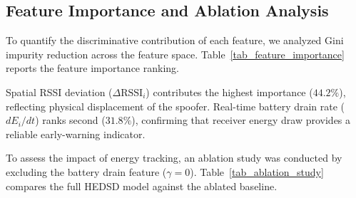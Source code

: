 \documentclass[conference]{IEEEtran}
\begin{document}
\begin{enumerate}
\subsection{Feature Importance and Ablation Analysis}
To quantify the discriminative contribution of each feature, we analyzed Gini impurity reduction across the feature space. Table~\ref{tab_feature_importance} reports the feature importance ranking.

\begin{table}[htbp]
\caption{Feature Importance Ranking in Multi-Feature Anomaly Engine}
\label{tab_feature_importance}
\centering
\small
\renewcommand{\arraystretch}{1.15}
\end{table}

Spatial RSSI deviation ($\Delta\text{RSSI}_i$) contributes the highest importance ($44.2\%$), reflecting physical displacement of the spoofer. Real-time battery drain rate ($dE_i/dt$) ranks second ($31.8\%$), confirming that receiver energy draw provides a reliable early-warning indicator.

To assess the impact of energy tracking, an ablation study was conducted by excluding the battery drain feature ($\gamma = 0$). Table~\ref{tab_ablation_study} compares the full HEDSD model against the ablated baseline.

\begin{table}[htbp]
\caption{Ablation Study: Performance With vs. Without Battery Drain Feature}
\label{tab_ablation_study}
\centering
\small
\renewcommand{\arraystretch}{1.15}
\end{table}


\end{enumerate}
\end{document}
